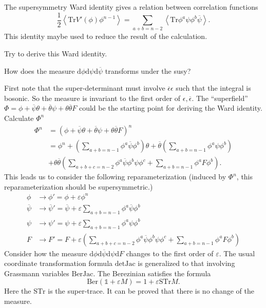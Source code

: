 The supersymmetry Ward identity gives a relation between correlation functions
\begin{equation}
	\frac{1}{2} \left<\mathrm{Tr} V'(\phi) \phi^{n-1} \right>
	= \sum_{a+b=n-2} \left<\mathrm{Tr} \phi^a \psi \phi^b \overline{\psi} \right>.
\end{equation}
This identity maybe used to reduce the result of the calculation.
\begin{problem}
Try to derive this Ward identity.	
\end{problem}
\begin{problem}
How does the measure $\mathrm{d}\phi \mathrm{d}\psi \mathrm{d}\overline{\psi}$ transforms under the susy?	
\end{problem}
First note that the super-determinant must involve $\overline{\epsilon}\epsilon$ such that the integral is bosonic.
So the measure is invariant to the first order of $\epsilon,\overline{\epsilon}$.
The ``superfield'' $\Phi = \phi + \overline{\psi}\theta + \overline{\theta}\psi + \theta \overline{\theta} F$ could be the starting point for deriving the Ward identity.
Calculate $\Phi^n$
\begin{align*}
	\Phi^n &= \left( \phi + \overline{\psi}\theta + \overline{\theta} \psi + \theta \overline{\theta} F \right)^n \\
		   &= \phi^n + \left( \sum_{a+b=n-1} \phi^a \overline{\psi} \phi^b \right) \theta + \overline{\theta} \left( \sum_{a+b=n-1} \phi^a \psi \phi^b\right)  \\
		   &+ \theta \overline{\theta}\left(\sum_{a+b+c=n-2} \phi^a \overline{\psi} \phi^b \psi \phi^c + \sum_{a+b=n-1}\phi^a F \phi^b\right).
\end{align*}
This leads us to consider the following reparameterization (induced by $\Phi^n$, this reparameterization should be supersymmetric.)
\begin{align*}
	\phi &\to \phi' = \phi + \varepsilon \phi^n \\	
	\overline{\psi} &\to \overline{\psi}' = \overline{\psi} + \varepsilon\sum_{a+b=n-1} \phi^a \overline{\psi} \phi^b \\
	\psi &\to \psi' = \psi + \varepsilon \sum_{a+b=n-1} \phi^a \psi \phi^b \\
	F &\to F' = F + \varepsilon\left( \sum_{a+b+c=n-2} \phi^a \overline{\psi} \phi^b \psi \phi^c + \sum_{a+b=n-1} \phi^a F \phi^b\right)
\end{align*}
Consider how the measure $\mathrm{d}\phi \mathrm{d}\overline{\psi} \mathrm{d}\psi \mathrm{d}F$ changes to the first order of $\varepsilon$.
The usual coordinate transformation formula $\mathrm{det} \mathrm{Jac}$ is generalized to that involving Grassmann variables $\mathrm{Ber} \mathrm{Jac}$.
The Berezinian satisfies the formula
\begin{equation}
	\mathrm{Ber} \left( \mathds{1} + \varepsilon M \right) = 1 + \varepsilon \mathrm{STr} M.	
\end{equation}
Here the $\mathrm{STr}$ is the super-trace.
It can be proved that there is no change of the measure.

